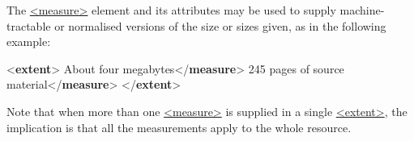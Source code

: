 The \hyperref[TEI.measure]{<measure>} element and its attributes may be used to supply machine-tractable or normalised versions of the size or sizes given, as in the following example: \par\bgroup{}\exampleFont \begin{shaded}\noindent\mbox{}{<\textbf{extent}>}\mbox{}\newline 
{}About four megabytes{</\textbf{measure}>}\mbox{}\newline 
{}245 pages of source\mbox{}\newline 
\hspace*{1em}\hspace*{1em} material{</\textbf{measure}>}\mbox{}\newline 
{</\textbf{extent}>}\end{shaded}\egroup\par \noindent  Note that when more than one \hyperref[TEI.measure]{<measure>} is supplied in a single \hyperref[TEI.extent]{<extent>}, the implication is that all the measurements apply to the whole resource.
